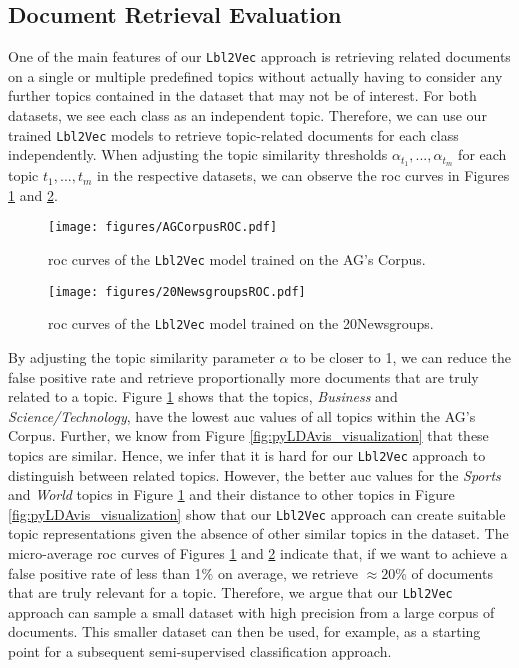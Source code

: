 \documentclass[a4paper,twoside]{article}
\begin{document}
\subsection{Document Retrieval Evaluation}\label{ROC_eval_section}
One of the main features of our \texttt{Lbl2Vec} approach is retrieving related documents on a single or multiple predefined topics without actually having to consider any further topics contained in the dataset that may not be of interest. For both datasets, we see each class as an independent topic. Therefore, we can use our trained \texttt{Lbl2Vec} models to retrieve topic-related documents for each class independently. When adjusting the topic similarity thresholds ${\alpha_{t_{1}},...,\alpha_{t_{m}}}$ for each topic ${t_1,...,t_m}$ in the respective datasets, we can observe the \ac{roc} curves in Figures \ref{fig:AGCorpus_ROC} and \ref{fig:20Newsgroups_ROC}.
\begin{figure}[ht]
    \centering
    \texttt{[image: figures/AGCorpusROC.pdf]}
    \caption{\ac{roc} curves of the \texttt{Lbl2Vec} model trained on the AG's Corpus.}
    \label{fig:AGCorpus_ROC}
\end{figure}
\begin{figure}[ht]
    \centering
    \texttt{[image: figures/20NewsgroupsROC.pdf]}
    \caption{\ac{roc} curves of the \texttt{Lbl2Vec} model trained on the 20Newsgroups.}
    \label{fig:20Newsgroups_ROC}
\end{figure}
By adjusting the topic similarity parameter $\alpha$ to be closer to 1, we can reduce the false positive rate and retrieve proportionally more documents that are truly related to a topic. Figure \ref{fig:AGCorpus_ROC} shows that the topics, \textit{Business} and \textit{Science/Technology}, have the lowest \ac{auc} values of all topics within the AG's Corpus. Further, we know from Figure \ref{fig:pyLDAvis_visualization} that these topics are similar. Hence, we infer that it is hard for our \texttt{Lbl2Vec} approach to distinguish between related topics. However, the better \ac{auc} values for the \textit{Sports} and \textit{World} topics in Figure \ref{fig:AGCorpus_ROC} and their distance to other topics in Figure \ref{fig:pyLDAvis_visualization} show that our \texttt{Lbl2Vec} approach can create suitable topic representations given the absence of other similar topics in the dataset. The micro-average \ac{roc} curves of Figures \ref{fig:AGCorpus_ROC} and \ref{fig:20Newsgroups_ROC} indicate that, if we want to achieve a false positive rate of less than 1\% on average, we retrieve $\approx20\%$ of documents that are truly relevant for a topic. Therefore, we argue that our \texttt{Lbl2Vec} approach can sample a small dataset with high precision from a large corpus of documents. This smaller dataset can then be used, for example, as a starting point for a subsequent semi-supervised classification approach.
\end{document}
